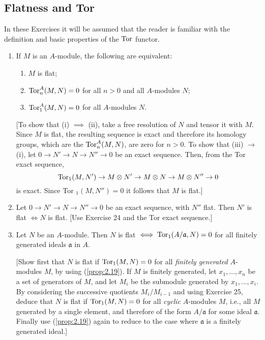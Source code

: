 \documentclass{standalone}
\theoremstyle{definition}
\theoremstyle{remark}
\begin{document}
\subsection{Flatness and Tor}
In these Exercises it will be assumed that the reader is familiar with the
definition and basic properties of the $\operatorname{Tor}$ functor.
\begin{enumerate}[resume*=exc2]
  \item If $M$ is an $A$-module, the following are equivalent:
\begin{enumerate}
\item $M$ is flat;
\item $\operatorname{Tor}_{n}^{A}(M, N)=0$ for all $n>0$ and all $A$-modules $N$;
\item $\operatorname{Tor}_{1}^{A}(M, N)=0$ for all $A$-modules $N$.
\end{enumerate}
[To show that (i) $\implies$ (ii), take a free resolution of $N$ and tensor it with
$M$. Since $M$ is flat, the resulting sequence is exact and therefore its
homology groups, which are the $\operatorname{Tor}_{n}^{A}(M, N)$, are
zero for $n>0$. To show that (iii) $\to$ (i), let $0 \to N' \to N \to N'' \to 0$
be an exact sequence. Then, from the Tor exact sequence,
\[
  \operatorname{Tor}_{1}(M, N') \to M \otimes N' \to M \otimes N \to M \otimes N'' \to 0
\]
is exact. Since Tor $_{1}(M, N'')=0$ it follows that $M$ is flat.]
  \item Let $0 \to N' \to N \to N'' \to 0$ be an exact sequence, with $N''$
        flat. Then $N'$ is flat $\iff N$ is flat. [Use Exercise 24
        and the Tor exact sequence.]
  \item Let $N$ be an $A$-module. Then $N$ is
        flat $\iff\operatorname{Tor}_{1}(A / \mathfrak{a}, N)=0$ for all finitely
        generated ideals $\mathfrak{a}$ in $A$.

[Show first that $N$ is flat if $\operatorname{Tor}_{1}(M, N)=0$ for all
{\itshape finitely generated} $A$-modules $M$, by using
(\ref{prop:2.19}). If $M$ is finitely 
generated, let $x_{1}, \ldots, x_{n}$ be a set of generators of $M$, and let
$M_{i}$ be the submodule generated by $x_{1}, \ldots, x_{i}$. By considering the
successive quotients $M_{i} / M_{i-1}$ and using Exercise
25, deduce that $N$ is flat if $\operatorname{Tor}_{1}(M, N)=0$ for all {\itshape cyclic}
$A$-modules $M$, i.e., all $M$ generated by a single element, and therefore of
the form $A / \mathfrak{a}$ for some ideal $\mathfrak{a}$. Finally use
(\ref{prop:2.19}) again to reduce to the case where $\mathfrak{a}$ is a finitely
generated ideal.]


\end{enumerate}
\end{document}
